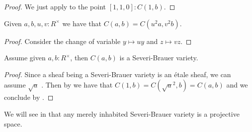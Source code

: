 \begin{proof}
We just apply  to the point $[1,1,0]:C(1,b)$.
\end{proof}

\begin{lemma}\label{conic-change-variable}
Given $a,b,u,v:R^\times$ we have that $C(a,b) = C(u^2a,v^2b)$.
\end{lemma}

\begin{proof}
Consider the change of variable $y\mapsto uy$ and $z\mapsto vz$.
\end{proof}

\begin{lemma}
Assume given $a,b:R^\times$, then $C(a,b)$ is a Severi-Brauer variety.
\end{lemma}

\begin{proof}
Since a sheaf being a Severi-Brauer variety is an \'etale sheaf, we can assume $\sqrt{a}$ . Then by  we have that $C(1,b) = C(\sqrt{a}^2,b)=C(a,b)$ and we conclude by .
\end{proof}

\begin{remark}
We will see in  that any merely inhabited Severi-Brauer variety is a projective space. 
\end{remark}

